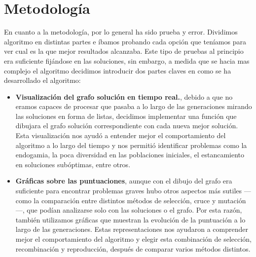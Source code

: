 \documentclass[12pt,a4paper]{report}
\begin{document}
\section{Metodología}
    En cuanto a la metodología, por lo general ha sido prueba y error. Dividimos algoritmo en distintas partes e íbamos probando cada opción que teníamos para ver cual es la que mejor resultados alcanzaba.
    Este tipo de pruebas al principio era suficiente fijándose en las soluciones, sin embargo, a medida que se hacia mas complejo el algoritmo decidimos introducir dos partes claves en como se ha desarrollado el algoritmo:
    \begin{itemize}
        \item \textbf{Visualización del grafo solución en tiempo real.}, debido a que no eramos capaces de procesar que pasaba a lo largo de las generaciones mirando las soluciones en forma de listas, decidimos implementar una función que dibujara el grafo solución correspondiente con cada nueva mejor solución. Esta visualización nos ayudó a entender mejor el comportamiento del algoritmo a lo largo del tiempo y nos permitió identificar problemas como la endogamia, la poca diversidad en las poblaciones iniciales, el estancamiento en soluciones subóptimas, entre otros.
        \item \textbf{Gráficas sobre las puntuaciones}, aunque con el dibujo del grafo era suficiente para encontrar problemas graves hubo otros aspectos más sutiles —como la comparación entre distintos métodos de selección, cruce y mutación—, que podían analizarse solo con las soluciones o el grafo. Por esta razón, también utilizamos gráficas que muestran la evolución de la puntuación a lo largo de las generaciones. Estas representaciones nos ayudaron a comprender mejor el comportamiento del algoritmo y elegir esta combinación de selección, recombinación y reproducción, después de comparar varios métodos distintos.
    \end{itemize}
\end{document}
